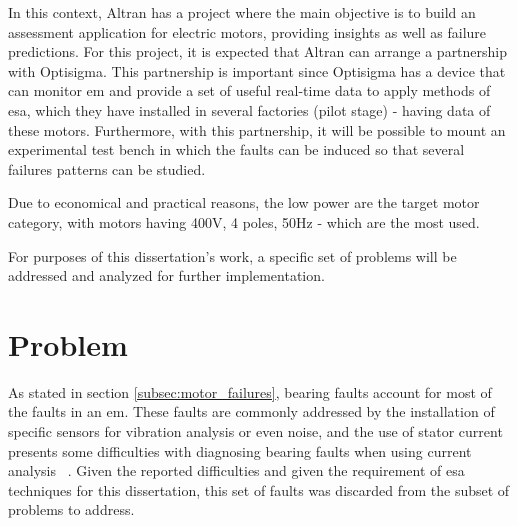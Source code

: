 In this context, Altran has a project where the main objective is to build an assessment application for electric motors, providing insights as well as failure predictions. For this project, it is expected that Altran can arrange a partnership with Optisigma. This partnership is important since Optisigma has a device that can monitor \acrlong{em} and provide a set of useful real-time data to apply methods of \acrfull{esa}, which they have installed in several factories (pilot stage) - having data of these motors. Furthermore, with this partnership, it will be possible to mount an experimental test bench in which the faults can be induced so that several failures patterns can be studied. 

Due to economical and practical reasons, the low power  are the target motor category, with motors having 400V, 4 poles, 50Hz - which are the most used.

For purposes of this dissertation's work, a specific set of problems will be addressed and analyzed for further implementation.





\section{Problem} %
\label{sec:problem}

As stated in section \ref{subsec:motor_failures}, bearing faults account for most of the faults in an \acrlong{em}. These faults are commonly addressed by the installation of specific sensors for vibration analysis or even noise, and the use of stator current presents some difficulties with diagnosing bearing faults when using current analysis ~\cite{Riera-Guasp2015}.  Given the reported difficulties and given the requirement of \Acrshort{esa} techniques for this dissertation, this set of faults was discarded from the subset of problems to address.

